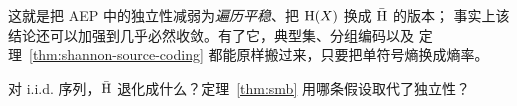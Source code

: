 这就是把 AEP 中的独立性减弱为\emph{遍历平稳}、把 $\mathrm{H}(X)$ 换成 $\bar{\mathrm{H}}$ 的版本；
事实上该结论还可以加强到几乎必然收敛。有了它，典型集、分组编码以及
定理~\ref{thm:shannon-source-coding} 都能原样搬过来，只要把单符号熵换成熵率。

\begin{yourturn}
对 i.i.d. 序列，$\bar{\mathrm{H}}$ 退化成什么？定理~\ref{thm:smb} 用哪条假设取代了独立性？
\ifshowanswers\else\workspace[2]\fi
{}
\end{yourturn}

\vspace{0.8cm}
